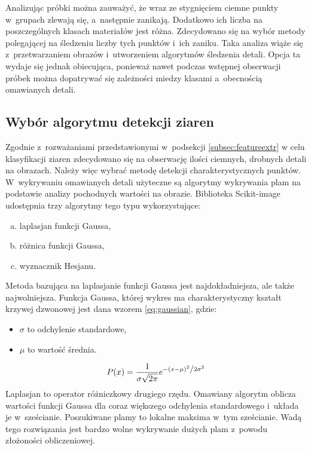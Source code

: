 Analizując próbki można zauważyć, że wraz ze stygnięciem ciemne punkty
w~grupach zlewają się, a~następnie zanikają.
Dodatkowo ich liczba na poszczególnych klasach materiałów jest różna.
Zdecydowano się na wybór metody polegającej na śledzeniu liczby tych punktów
i~ich zaniku.
Taka analiza wiąże się z~przetwarzaniem obrazów i~utworzeniem algorytmów
śledzenia detali.
Opcja ta wydaje się jednak obiecująca, ponieważ nawet podczas wstępnej
obserwacji próbek można dopatrywać się zależności miedzy klasami a~obecnością
omawianych detali.

\subsection{Wybór algorytmu detekcji ziaren}
Zgodnie z~rozważaniami przedstawionymi w~podsekcji \ref{subsec:featureextr}
w celu klasyfikacji ziaren zdecydowano się na obserwację ilości ciemnych,
drobnych detali na obrazach.
Należy więc wybrać metodę detekcji charakterystycznych punktów.
W~wykrywaniu omawianych detali użyteczne są algorytmy wykrywania plam na
podstawie analizy pochodnych wartości na obrazie.
Biblioteka Scikit-image udostępnia trzy algorytmy tego typu wykorzystujące:
\begin{enumerate}[a)]
	\item laplasjan funkcji Gaussa,
	\item różnica funkcji Gaussa,
	\item wyznacznik Hesjanu.
\end{enumerate}

Metoda bazująca na laplasjanie funkcji Gaussa jest najdokładniejsza, ale
także najwolniejsza.
Funkcja Gaussa, której wykres ma charakterystyczny kształt krzywej dzwonowej
jest dana wzorem \ref{eq:gaussian}, gdzie:
\begin{itemize}
	\item $ \sigma $ to odchylenie standardowe,
	\item $ \mu $ to wartość średnia.
\end{itemize}
\begin{equation}
	P(x) = \frac{1}{{\sigma \sqrt {2\pi } }}
	e^{{{ - \left( {x - \mu } \right)^2 }
	\mathord{\left/ {\vphantom {{ - \left( {x - \mu } \right)^2 }
	{2\sigma ^2 }}} \right. \kern-\nulldelimiterspace} {2\sigma ^2 }}}
\label{eq:gaussian}
\end{equation}
Laplasjan to operator różniczkowy drugiego rzędu.
Omawiany algorytm oblicza wartości funkcji Gaussa dla coraz większego
odchylenia standardowego i~układa je w~sześcianie.
Poszukiwane plamy to lokalne maksima w~tym sześcianie.
Wadą tego rozwiązania jest bardzo wolne wykrywanie dużych plam z~powodu
złożoności obliczeniowej.

